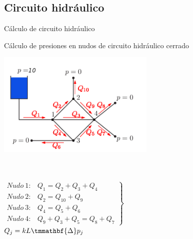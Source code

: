 \documentclass [8pt] {beamer}
\begin{document}
    \subsection{Circuito hidráulico}
        \begin{frame}{Cálculo de circuito hidráulico}
            \begin{exampleblock}{Cálculo de presiones en nudos de circuito hidráulico cerrado}
            \begin{center}
                {\includegraphics[height=5cm]{hidraulic.png}}
            \end{center} \\ \ \\ 
            {$\left. \begin{array}{ll}
            Nudo \ 1 : & Q_1 = Q_2 + Q_3 + Q_4\\
            Nudo \ 2 : & Q_2 = Q_{10} + Q_9\\
            Nudo \ 3 : & Q_4 = Q_5 + Q_6\\
            Nudo \ 4 : & Q_9 + Q_3 + Q_5 = Q_8 + Q_7
            \end{array} \right\}$} \ \ \  \ \ \ \ \ \ \ \ \ \ \ \ \ \ \Large{$Q_j = k L\tmmathbf{\Delta}p_j $}
            \end{exampleblock}
        \end{frame}
\end{document}
